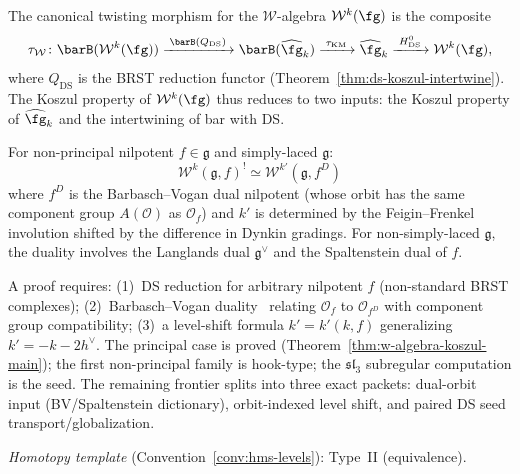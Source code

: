 \begin{remark}
\label{rem:w-twisting-morphism}
The canonical twisting morphism for the $\mathcal{W}$-algebra
$\mathcal{W}^k(\fg)$ is the composite
\[
\tau_{\mathcal{W}} \colon
\barB(\mathcal{W}^k(\fg))
\xrightarrow{\;\barB(Q_{\mathrm{DS}})\;}
\barB(\widehat{\fg}_k)
\xrightarrow{\;\tau_{\mathrm{KM}}\;}
\widehat{\fg}_k
\xrightarrow{\;H^0_{\mathrm{DS}}\;}
\mathcal{W}^k(\fg),
\]
where $Q_{\mathrm{DS}}$ is the BRST reduction functor
(Theorem~\ref{thm:ds-koszul-intertwine}).  The Koszul property
of $\mathcal{W}^k(\fg)$ thus reduces to two inputs: the Koszul
property of $\widehat{\fg}_k$ and the intertwining of bar with DS.
\end{remark}

\begin{conjecture}\label{conj:w-orbit-duality}
For non-principal nilpotent $f \in \mathfrak{g}$ and simply-laced $\mathfrak{g}$:
\begin{equation}
\mathcal{W}^k(\mathfrak{g}, f)^! \simeq \mathcal{W}^{k'}(\mathfrak{g}, f^D)
\end{equation}
where $f^D$ is the Barbasch--Vogan dual nilpotent (whose orbit has the same component group $A(\mathcal{O})$ as $\mathcal{O}_f$) and $k'$ is determined by the Feigin--Frenkel involution shifted by the difference in Dynkin gradings.  For non-simply-laced $\mathfrak{g}$, the duality involves the Langlands dual $\mathfrak{g}^\vee$ and the Spaltenstein dual of $f$.
\end{conjecture}

\begin{remark}[Scope]
A proof requires: (1)~DS reduction for arbitrary nilpotent $f$ (non-standard BRST complexes); (2)~Barbasch--Vogan duality~\cite{BV85} relating $\mathcal{O}_f$ to $\mathcal{O}_{f^D}$ with component group compatibility; (3)~a level-shift formula $k' = k'(k,f)$ generalizing $k' = -k - 2h^\vee$.  The principal case is proved (Theorem~\ref{thm:w-algebra-koszul-main}); the first non-principal family is hook-type; the $\mathfrak{sl}_3$ subregular computation is the seed.  The remaining frontier splits into three exact packets: dual-orbit input (BV/Spaltenstein dictionary), orbit-indexed level shift, and paired DS seed transport/globalization.

\emph{Homotopy template} (Convention~\ref{conv:hms-levels}): Type~II (equivalence).
\end{remark}

